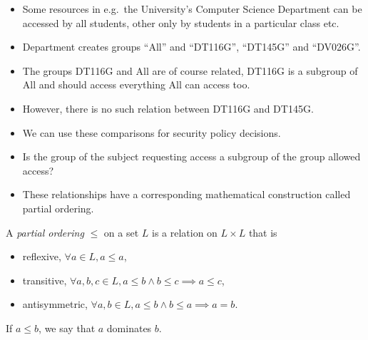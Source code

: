 \begin{frame}
  \begin{itemize}
    \item Some resources in e.g.\ the University's Computer Science Department 
      can be accessed by all students, other only by students in a particular 
      class etc.

    \item Department creates groups ``All'' and ``DT116G'', ``DT145G'' and 
      ``DV026G''.

    \item The groups DT116G and All are of course related, DT116G is a subgroup 
      of All and should access everything All can access too.

    \item However, there is no such relation between DT116G and DT145G.

  \end{itemize}
\end{frame}

\begin{frame}
  \begin{itemize}
    \item We can use these comparisons for security policy decisions.

    \item Is the group of the subject requesting access a subgroup of the group 
      allowed access?

    \item These relationships have a corresponding mathematical construction 
      called partial ordering.

  \end{itemize}
\end{frame}

\begin{frame}
  \begin{definition}
    A \emph{partial ordering} \(\leq\) on a set \(L\) is a relation on 
    \(L\times L\) that is
    \begin{itemize}
      \item reflexive, \(\forall a\in L, a\leq a\),
      \item transitive, \(\forall a,b,c\in L, a\leq b\land b\leq c\implies 
        a\leq c\),
      \item antisymmetric, \(\forall a,b\in L, a\leq b\land b\leq a\implies 
        a=b\).
    \end{itemize}
    If \(a\leq b\), we say that \(a\) dominates \(b\).
  \end{definition}
\end{frame}

